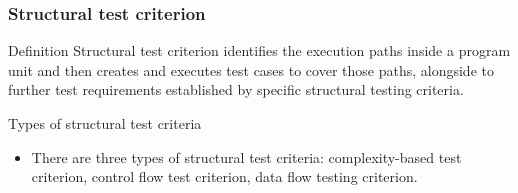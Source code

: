 \begin{frame}[parent={cmap:structural-software-testing},hasnext=false,hasprev=true]
\frametitle{Structural test criterion}
\label{concept:structural-test-criterion}

\begin{block:concept}{Definition}
Structural test criterion identifies the execution paths inside a
program unit and then creates and executes test cases to cover those
paths, alongside to further test requirements established by specific
structural testing criteria.
\end{block:concept}


\begin{block:fact}{Types of structural test criteria}
\begin{itemize}
	\item There are three types of structural test criteria: complexity-based
	test criterion, control flow test criterion, data flow testing criterion.
\end{itemize}
\end{block:fact}

\end{frame}